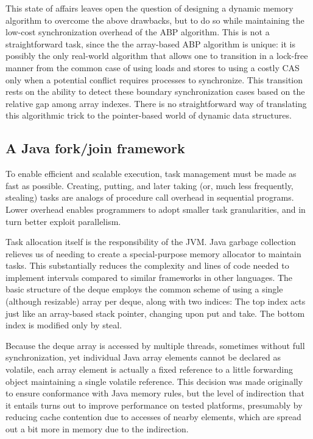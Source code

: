 This state of affairs leaves open the question of designing a dynamic
memory algorithm to overcome the above drawbacks, but to do so while
maintaining the low-cost synchronization overhead of the ABP
algorithm. This is not a straightforward task, since the the
array-based ABP algorithm is unique: it is possibly the only
real-world algorithm that allows one to transition in a lock-free
manner from the common case of using loads and stores to using a
costly CAS only when a potential conflict requires processes to
synchronize. This transition rests on the ability to detect these
boundary synchronization cases based on the relative gap among array
indexes. There is no straightforward way of translating this
algorithmic trick to the pointer-based world of dynamic data
structures.

\subsection{A Java fork/join framework \cite{Lea2000}}

To enable efficient and scalable execution, task management must be
made as fast as possible. Creating, putting, and later taking (or,
much less frequently, stealing) tasks are analogs of procedure call
overhead in sequential programs. Lower overhead enables programmers to
adopt smaller task granularities, and in turn better exploit
parallelism.

Task allocation itself is the responsibility of the JVM. Java garbage
collection relieves us of needing to create a special-purpose memory
allocator to maintain tasks. This substantially reduces the complexity
and lines of code needed to implement intervals compared to similar
frameworks in other languages. The basic structure of the deque
employs the common scheme of using a single (although resizable) array
per deque, along with two indices: The top index acts just like an
array-based stack pointer, changing upon put and take. The bottom
index is modified only by steal.

Because the deque array is accessed by multiple threads, sometimes
without full synchronization, yet individual Java array elements
cannot be declared as volatile, each array element is actually a fixed
reference to a little forwarding object maintaining a single volatile
reference. This decision was made originally to ensure conformance
with Java memory rules, but the level of indirection that it entails
turns out to improve performance on tested platforms, presumably by
reducing cache contention due to accesses of nearby elements, which
are spread out a bit more in memory due to the indirection.

